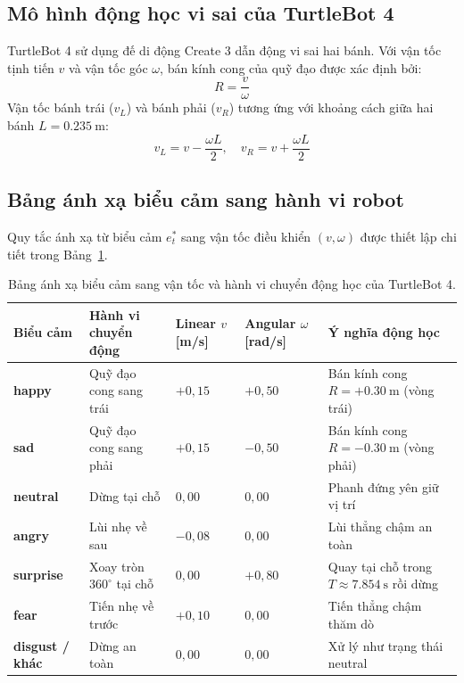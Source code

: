 \subsection{Mô hình động học vi sai của TurtleBot 4}
TurtleBot 4 sử dụng đế di động Create 3 dẫn động vi sai hai bánh. Với vận tốc tịnh tiến $v$ và vận tốc góc $\omega$, bán kính cong của quỹ đạo được xác định bởi:
\begin{equation}
    R = \frac{v}{\omega}
\end{equation}
Vận tốc bánh trái ($v_L$) và bánh phải ($v_R$) tương ứng với khoảng cách giữa hai bánh $L = \SI{0.235}{\meter}$:
\begin{equation}
    v_L = v - \frac{\omega L}{2}, \quad v_R = v + \frac{\omega L}{2}
\end{equation}

\subsection{Bảng ánh xạ biểu cảm sang hành vi robot}
Quy tắc ánh xạ từ biểu cảm $e^*_t$ sang vận tốc điều khiển $(v, \omega)$ được thiết lập chi tiết trong Bảng~\ref{tab:emotion_vel_specs}.

\begin{table}[H]
\centering
\footnotesize
\renewcommand{\arraystretch}{1.25}
\setlength{\tabcolsep}{4pt}
\begin{tabularx}{\textwidth}{
    >{\raggedright\arraybackslash}p{2.0cm}
    >{\raggedright\arraybackslash}p{3.5cm}
    >{\centering\arraybackslash}p{2.2cm}
    >{\centering\arraybackslash}p{2.2cm}
    >{\raggedright\arraybackslash}X}
\toprule
\textbf{Biểu cảm} & \textbf{Hành vi chuyển động} & \textbf{Linear $v$ [m/s]} & \textbf{Angular $\omega$ [rad/s]} & \textbf{Ý nghĩa động học} \\
\midrule
\textbf{happy} & Quỹ đạo cong sang trái & $+0{,}15$ & $+0{,}50$ & Bán kính cong $R = +\SI{0.30}{\meter}$ (vòng trái) \\
\textbf{sad} & Quỹ đạo cong sang phải & $+0{,}15$ & $-0{,}50$ & Bán kính cong $R = -\SI{0.30}{\meter}$ (vòng phải) \\
\textbf{neutral} & Dừng tại chỗ & $0{,}00$ & $0{,}00$ & Phanh đứng yên giữ vị trí \\
\textbf{angry} & Lùi nhẹ về sau & $-0{,}08$ & $0{,}00$ & Lùi thẳng chậm an toàn \\
\textbf{surprise} & Xoay tròn $360^\circ$ tại chỗ & $0{,}00$ & $+0{,}80$ & Quay tại chỗ trong $T \approx \SI{7.854}{\second}$ rồi dừng \\
\textbf{fear} & Tiến nhẹ về trước & $+0{,}10$ & $0{,}00$ & Tiến thẳng chậm thăm dò \\
\textbf{disgust / khác} & Dừng an toàn & $0{,}00$ & $0{,}00$ & Xử lý như trạng thái neutral \\
\bottomrule
\end{tabularx}
\caption{Bảng ánh xạ biểu cảm sang vận tốc và hành vi chuyển động học của TurtleBot 4.}
\label{tab:emotion_vel_specs}
\end{table}

